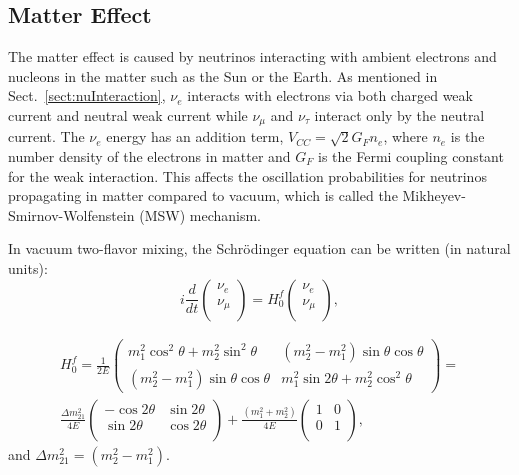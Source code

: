 \subsection{Matter Effect}\label{sect:MSW}
The matter effect is caused by neutrinos interacting with ambient electrons and nucleons in the matter such as the Sun or the Earth. As mentioned in Sect.~\ref{sect:nuInteraction}, $\nu_e$ interacts with electrons via both charged weak current and neutral weak current while $\nu_\mu$ and $\nu_\tau$ interact only by the neutral current. The $\nu_e$ energy has an addition term, $V_{CC} =\sqrt2G_Fn_e$, where $n_e$ is the number density of the electrons in matter and $G_F$ is the Fermi coupling constant for the weak interaction. This affects the oscillation probabilities for neutrinos propagating in matter compared to vacuum, which is called the Mikheyev-Smirnov-Wolfenstein (MSW) mechanism\cite{smirnov2016solar,smirnov2005msw}.

In vacuum two-flavor mixing, the Schr\"{o}dinger equation can be written (in natural units)\cite{xing2011neutrinos}:
\begin{equation}\label{eq:2flavor_simple}
	i\frac{d}{dt}\begin{pmatrix}
		\nu_e\\
		\nu_\mu\\
	\end{pmatrix}
	=
	H^f_0
	\begin{pmatrix}
		\nu_e\\
		\nu_\mu\\
	\end{pmatrix},
\end{equation}

\begin{equation} \label{eq:H0f}
\begin{aligned}
 H^f_0 = \frac{1}{2E}\begin{pmatrix}m^2_1\cos^2\theta+m^2_2\sin^2\theta & (m^2_2-m^2_1)\sin\theta\cos\theta \\ (m^2_2-m^2_1)\sin\theta\cos\theta & m^2_1\sin2\theta+m^2_2\cos^2\theta\end{pmatrix} =
\\
\frac{\Delta m_{21}^2}{4E}\begin{pmatrix}
	-\cos 2\theta & \sin 2\theta\\
	\sin 2\theta & \cos 2\theta\\
\end{pmatrix}+\frac{(m_1^2+m_2^2)}{4E}\begin{pmatrix}
	1 & 0\\
	0 &1\\
\end{pmatrix},
\end{aligned}
\end{equation}
and $\Delta m^2_{21}=(m^2_2 - m^2_1)$.

